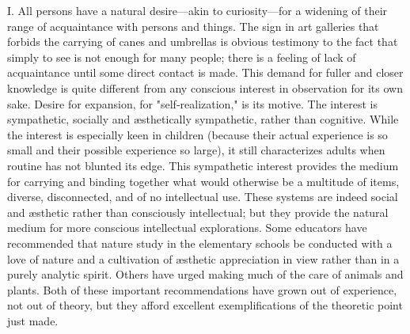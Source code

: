 \documentclass[letterpaper]{book}
\begin{document}

I. All persons have a natural desire---akin to curiosity---for a
widening of their range of acquaintance with persons and things. The
sign in art galleries that forbids the carrying of canes and umbrellas
is obvious testimony to the fact that simply to see is not enough for
many people; there is a feeling of lack of acquaintance until some
direct contact is made. This demand for fuller and closer knowledge is
quite different from any conscious interest in observation for its own
sake. Desire for expansion, for "self-realization," is its motive. The
interest is sympathetic, socially and æsthetically sympathetic, rather
than cognitive. While the interest is especially keen in children
(because their actual experience is so small and their possible
experience so large), it still characterizes adults when routine has not
blunted its edge. This sympathetic interest provides the medium for
carrying and binding together what would otherwise be a multitude of
items, diverse, disconnected, and of no intellectual use. These systems
are indeed social and æsthetic rather than consciously
intellectual;
but they provide the natural medium for more conscious intellectual
explorations. Some educators have recommended that nature study in the
elementary schools be conducted with a love of nature and a cultivation
of æsthetic appreciation in view rather than in a purely analytic
spirit. Others have urged making much of the care of animals and plants.
Both of these important recommendations have grown out of experience,
not out of theory, but they afford excellent exemplifications of the
theoretic point just made.


\end{document}
